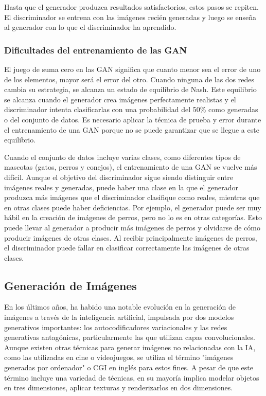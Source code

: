 Hasta que el generador produzca resultados satisfactorios, estos pasos se repiten. El discriminador se entrena con las imágenes recién generadas y luego se enseña al generador con lo que el discriminador ha aprendido. \parencite{bk_geron2019machilear}

\subsubsection{Dificultades del entrenamiento de las GAN}

El juego de suma cero en las GAN significa que cuanto menor sea el error de uno de los elementos, mayor será el error del otro. Cuando ninguna de las dos redes cambia su estrategia, se alcanza un estado de equilibrio de Nash. Este equilibrio se alcanza cuando el generador crea imágenes perfectamente realistas y el discriminador intenta clasificarlas con una probabilidad del 50\% como generadas o del conjunto de datos. Es necesario aplicar la técnica de prueba y error durante el entrenamiento de una GAN porque no se puede garantizar que se llegue a este equilibrio. \parencite{bk_geron2019machilear}

Cuando el conjunto de datos incluye varias clases, como diferentes tipos de mascotas (gatos, perros y conejos), el entrenamiento de una GAN se vuelve más difícil. Aunque el objetivo del discriminador sigue siendo distinguir entre imágenes reales y generadas, puede haber una clase en la que el generador produzca más imágenes que el discriminador clasifique como reales, mientras que en otras clases puede haber deficiencias. Por ejemplo, el generador puede ser muy hábil en la creación de imágenes de perros, pero no lo es en otras categorías. Esto puede llevar al generador a producir más imágenes de perros y olvidarse de cómo producir imágenes de otras clases. Al recibir principalmente imágenes de perros, el discriminador puede fallar en clasificar correctamente las imágenes de otras clases. \parencite{bk_geron2019machilear}

\subsection{Generación de Imágenes}

En los últimos años, ha habido una notable evolución en la generación de imágenes a través de la inteligencia artificial, impulsada por dos modelos generativos importantes: los autocodificadores variacionales y las redes generativas antagónicas, particularmente las que utilizan capas convolucionales. Aunque existen otras técnicas para generar imágenes no relacionadas con la IA, como las utilizadas en cine o videojuegos, se utiliza el término "imágenes generadas por ordenador" o CGI en inglés para estos fines. A pesar de que este término incluye una variedad de técnicas, en su mayoría implica modelar objetos en tres dimensiones, aplicar texturas y renderizarlos en dos dimensiones. \parencite{tec_kingma2019variat}

